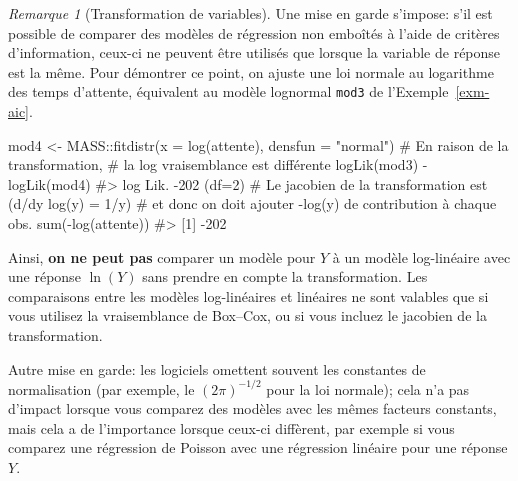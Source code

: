 \documentclass[
  11pt,
  letterpaper,
]{scrbook}
\newenvironment{Shaded}{\begin{snugshade}}{\end{snugshade}}
\newcommand{\AttributeTok}[1]{\textcolor[rgb]{0.40,0.45,0.13}{#1}}
\newcommand{\CommentTok}[1]{\textcolor[rgb]{0.37,0.37,0.37}{#1}}
\newcommand{\FunctionTok}[1]{\textcolor[rgb]{0.28,0.35,0.67}{#1}}
\newcommand{\NormalTok}[1]{\textcolor[rgb]{0.00,0.23,0.31}{#1}}
\newcommand{\OtherTok}[1]{\textcolor[rgb]{0.00,0.23,0.31}{#1}}
\newcommand{\SpecialCharTok}[1]{\textcolor[rgb]{0.37,0.37,0.37}{#1}}
\newcommand{\StringTok}[1]{\textcolor[rgb]{0.13,0.47,0.30}{#1}}
\theoremstyle{plain}
\theoremstyle{plain}
\theoremstyle{definition}
\theoremstyle{definition}
\theoremstyle{remark}
\newtheorem{refremark}{Remarque}[chapter]
\begin{document}
\begin{refremark}[Transformation de variables]
Une mise en garde s'impose: s'il est possible de comparer des modèles de
régression non emboîtés à l'aide de critères d'information, ceux-ci ne
peuvent être utilisés que lorsque la variable de réponse est la même.
Pour démontrer ce point, on ajuste une loi normale au logarithme des
temps d'attente, équivalent au modèle lognormal \texttt{mod3} de
l'Exemple~\ref{exm-aic}.

\begin{Shaded}
\begin{Highlighting}[]
\NormalTok{mod4 }\OtherTok{\textless{}{-}}\NormalTok{ MASS}\SpecialCharTok{::}\FunctionTok{fitdistr}\NormalTok{(}\AttributeTok{x =} \FunctionTok{log}\NormalTok{(attente), }\AttributeTok{densfun =} \StringTok{"normal"}\NormalTok{)}
\CommentTok{\# En raison de la transformation, }
\CommentTok{\# la log vraisemblance est différente}
\FunctionTok{logLik}\NormalTok{(mod3) }\SpecialCharTok{{-}} \FunctionTok{logLik}\NormalTok{(mod4)}
\CommentTok{\#\textgreater{} \textquotesingle{}log Lik.\textquotesingle{} {-}202 (df=2)}
\CommentTok{\# Le jacobien de la transformation est (d/dy log(y) = 1/y)}
\CommentTok{\# et donc on doit ajouter {-}log(y) de contribution à chaque obs.}
\FunctionTok{sum}\NormalTok{(}\SpecialCharTok{{-}}\FunctionTok{log}\NormalTok{(attente))}
\CommentTok{\#\textgreater{} [1] {-}202}
\end{Highlighting}
\end{Shaded}

Ainsi, \textbf{on ne peut pas} comparer un modèle pour \(Y\) à un modèle
log-linéaire avec une réponse \(\ln(Y)\) sans prendre en compte la
transformation. Les comparaisons entre les modèles log-linéaires et
linéaires ne sont valables que si vous utilisez la vraisemblance de
Box--Cox, ou si vous incluez le jacobien de la transformation.

\label{rem-warning-transformation}

\end{refremark}

Autre mise en garde: les logiciels omettent souvent les constantes de
normalisation (par exemple, le \((2\pi)^{-1/2}\) pour la loi normale);
cela n'a pas d'impact lorsque vous comparez des modèles avec les mêmes
facteurs constants, mais cela a de l'importance lorsque ceux-ci
diffèrent, par exemple si vous comparez une régression de Poisson avec
une régression linéaire pour une réponse \(Y.\)

\end{document}
